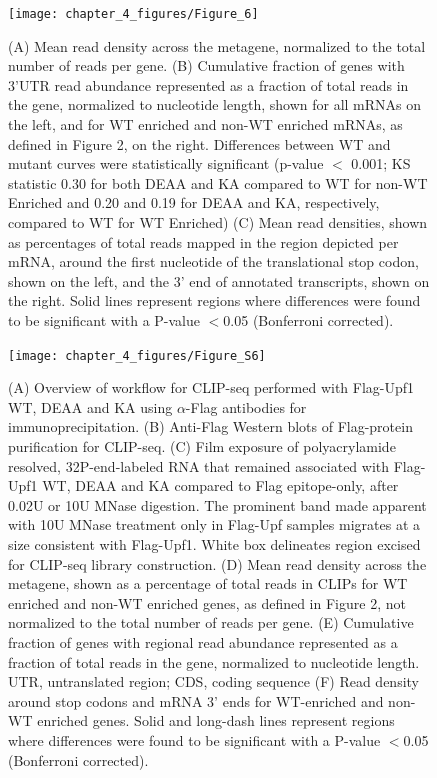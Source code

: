 \begin{figure}[ht]
  \centering
  \texttt{[image: chapter\_4\_figures/Figure\_6]}
  \caption[Figure 2. Upf1 WT and ATPase mutants cross-link preferentially in 3’UTRs, with elevated crosslinking for ATPase mutants downstream of termination codons and near 3’ ends]{(A) Mean read density across the metagene, normalized to the total number of reads per gene. (B) Cumulative fraction of genes with 3’UTR read abundance represented as a fraction of total reads in the gene, normalized to nucleotide length, shown for all mRNAs on the left, and for WT enriched and non-WT enriched mRNAs, as defined in Figure 2, on the right. Differences between WT and mutant curves were statistically significant (p-value $<$ 0.001; KS statistic 0.30 for both DEAA and KA compared to WT for non-WT Enriched and 0.20 and 0.19 for DEAA and KA, respectively, compared to WT for WT Enriched) (C) Mean read densities, shown as percentages of total reads mapped in the region depicted per mRNA, around the first nucleotide of the translational stop codon, shown on the left, and the 3’ end of annotated transcripts, shown on the right. Solid lines represent regions where differences were found to be significant with a P-value $<$0.05 (Bonferroni corrected).
    }
  \label{fig:Figure_2}
\end{figure}

\begin{figure}[ht]
  \centering
  \texttt{[image: chapter\_4\_figures/Figure\_S6]}
  \caption[Supplementary Figure 2. Supplemental data related to CLIP-seq]{(A) Overview of workflow for CLIP-seq performed with Flag-Upf1 WT, DEAA and KA using $\alpha$-Flag antibodies for immunoprecipitation. (B) Anti-Flag Western blots of Flag-protein purification for CLIP-seq. (C) Film exposure of polyacrylamide resolved, 32P-end-labeled RNA that remained associated with Flag-Upf1 WT, DEAA and KA compared to Flag epitope-only, after 0.02U or 10U MNase digestion. The prominent band made apparent with 10U MNase treatment only in Flag-Upf samples migrates at a size consistent with Flag-Upf1. White box delineates region excised for CLIP-seq library construction. (D) Mean read density across the metagene, shown as a percentage of total reads in CLIPs for WT enriched and non-WT enriched genes, as defined in Figure 2, not normalized to the total number of reads per gene. (E) Cumulative fraction of genes with regional read abundance represented as a fraction of total reads in the gene, normalized to nucleotide length. UTR, untranslated region; CDS, coding sequence (F) Read density around stop codons and mRNA 3’ ends for WT-enriched and non-WT enriched genes. Solid and long-dash lines represent regions where differences were found to be significant with a P-value $<$0.05 (Bonferroni corrected). }
  \label{fig:Figure_S2}
\end{figure}



